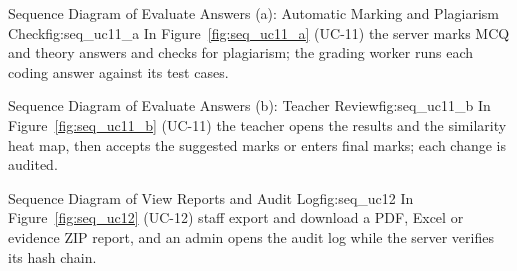 %
{Sequence Diagram of Evaluate Answers (a): Automatic Marking and Plagiarism Check}{fig:seq_uc11_a}%
{In Figure~\ref{fig:seq_uc11_a} (UC-11) the server marks MCQ and theory answers and checks for plagiarism; the grading worker runs each coding answer against its test cases.}

%
{Sequence Diagram of Evaluate Answers (b): Teacher Review}{fig:seq_uc11_b}%
{In Figure~\ref{fig:seq_uc11_b} (UC-11) the teacher opens the results and the similarity heat map, then accepts the suggested marks or enters final marks; each change is audited.}

%
{Sequence Diagram of View Reports and Audit Log}{fig:seq_uc12}%
{In Figure~\ref{fig:seq_uc12} (UC-12) staff export and download a PDF, Excel or evidence ZIP report, and an admin opens the audit log while the server verifies its hash chain.}
